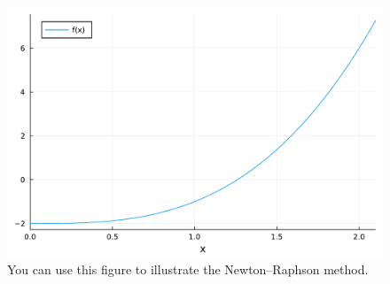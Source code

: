 \documentclass[10pt]{article}
\theoremstyle{definition}
\theoremstyle{remark}
\theoremstyle{plain}%
\begin{document}
\newpage
\begin{figure}[ht]
    \centering
    \includegraphics[width=\linewidth]{newton-raphson.pdf}
    \caption{You can use this figure to illustrate the Newton--Raphson method.}%
    \label{fig:nr}
\end{figure}
\end{document}
